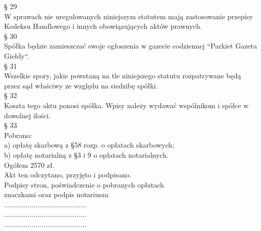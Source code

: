 \documentclass[a4paper, 11pt]{article}
\begin{document}
§ 29\\

W sprawach nie uregulowanych niniejszym statutem mają zastosowanie przepisy Kodeksu Handlowego i innych obowiązujących aktów prawnych.\\ 

§ 30\\

Spółka będzie zamieszczać swoje ogłoszenia w gazecie codziennej “Parkiet Gazeta Giełdy“.\\ 

§ 31\\

Wszelkie spory, jakie powstaną na tle niniejszego statutu rozpatrywane będą przez sąd właściwy ze względu na siedzibę spółki.\\ 

§ 32\\

Koszta tego aktu ponosi spółka. Wpisy należy wydawać wspólnikom i spółce w dowolnej ilości.\\ 

§ 33\\

Pobrano:\\
a)	opłatę skarbową z §58 rozp. o opłatach skarbowych; \\
b)	opłatę notarialną z §3 i 9 o opłatach notarialnych.\\
Ogółem 2570 zł.\\
Akt ten odczytano, przyjęto i podpisano.\\

Podpisy stron, poświadczenie o pobranych opłatach\\
znaczkami oraz podpis notariusza\\
..........................................\\
..........................................\\
..........................................\\
\end{document}
